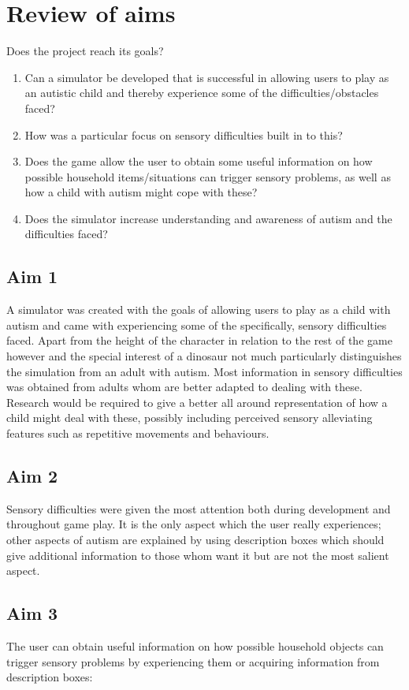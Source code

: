 \documentclass[11pt]{report}
\begin{document}
\section{Review of aims}

Does the project reach its goals?
\begin{enumerate}
\item Can a simulator be developed that is successful in allowing users to play as an autistic child and thereby experience some of the difficulties/obstacles faced?
\item How was a particular focus on sensory difficulties built in to this?
\item Does the game allow the user to obtain some useful information on how possible household items/situations can trigger sensory problems, as well as how a child with autism might cope with these?
\item Does the simulator increase understanding and awareness of autism and the difficulties faced?
\end{enumerate}

\subsection*{Aim 1}
A simulator was created with the goals of allowing users to play as a child with autism and came with experiencing some of the specifically, sensory difficulties faced. Apart from the height of the character in relation to the rest of the game however and the special interest of a dinosaur not much particularly distinguishes the simulation from an adult with autism. Most information in sensory difficulties was obtained from adults whom are better adapted to dealing with these. Research would be required to give a better all around representation of how a child might deal with these, possibly including perceived sensory alleviating features such as repetitive movements and behaviours.  

\subsection*{Aim 2}
Sensory difficulties were given the most attention both during development and throughout game play. It is the only aspect which the user really experiences; other aspects of autism are explained by using description boxes which should give additional information to those whom want it but are not the most salient aspect. 

\subsection*{Aim 3}
The user can obtain useful information on how possible household objects can trigger sensory problems by experiencing them or acquiring information from description boxes:
\end{document}

